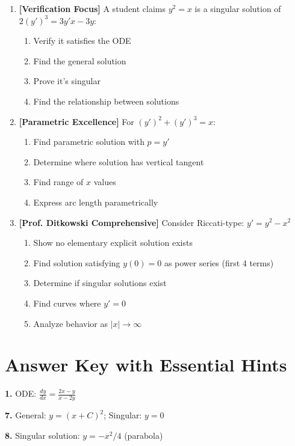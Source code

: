 \documentclass[12pt]{article}
\begin{document}
\begin{enumerate}[resume]
\item \textbf{[Verification Focus]} A student claims $y^2 = x$ is a singular solution of $2(y')^3 = 3y'x - 3y$:
    \begin{enumerate}
        \item Verify it satisfies the ODE
        \item Find the general solution
        \item Prove it's singular
        \item Find the relationship between solutions
    \end{enumerate}

\item \textbf{[Parametric Excellence]} For $(y')^2 + (y')^3 = x$:
    \begin{enumerate}
        \item Find parametric solution with $p = y'$
        \item Determine where solution has vertical tangent
        \item Find range of $x$ values
        \item Express arc length parametrically
    \end{enumerate}

\item \textbf{[Prof. Ditkowski Comprehensive]}
    Consider Riccati-type: $y' = y^2 - x^2$
    \begin{enumerate}
        \item Show no elementary explicit solution exists
        \item Find solution satisfying $y(0) = 0$ as power series (first 4 terms)
        \item Determine if singular solutions exist
        \item Find curves where $y' = 0$
        \item Analyze behavior as $|x| \to \infty$
    \end{enumerate}
\end{enumerate}

\section*{Answer Key with Essential Hints}

\textbf{1.} ODE: $\frac{dy}{dx} = \frac{2x - y}{x - 2y}$

\textbf{7.} General: $y = (x + C)^2$; Singular: $y = 0$

\textbf{8.} Singular solution: $y = -x^2/4$ (parabola)
\end{document}
